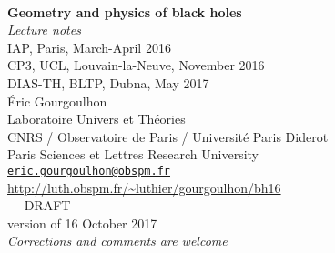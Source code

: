 \documentclass[12pt,a4paper]{book}
\begin{document}
\begin{titlepage}
\
\vspace{4cm}
\begin{center}
{\Huge\textbf{Geometry and physics of black holes}}\\[2ex]
{\Huge\emph{Lecture notes}}\\[3ex]
{\Large IAP, Paris, March-April 2016} \\[1ex]
{\Large CP3, UCL, Louvain-la-Neuve, November 2016}\\[1ex]
{\Large DIAS-TH, BLTP, Dubna, May 2017}\\[8ex]
Éric Gourgoulhon \\
Laboratoire Univers et Théories \\
CNRS / Observatoire de Paris / Université Paris Diderot\\
Paris Sciences et Lettres Research University\\
\href{mailto:eric.gourgoulhon@obspm.fr}{\texttt{eric.gourgoulhon@obspm.fr}}\\[8ex]
\url{http://luth.obspm.fr/~luthier/gourgoulhon/bh16}\\[8ex]
{\Huge --- DRAFT ---}\\[2ex]
{version of 16 October 2017}\\[2ex]
\emph{\Large Corrections and comments are welcome}
\end{center}
\end{titlepage}


\dominitoc

\newpage


\tableofcontents









\end{document}
